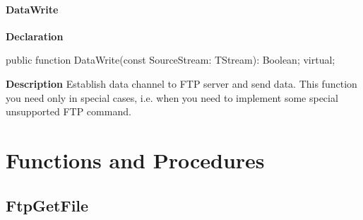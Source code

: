 \documentclass{report}
\newif\ifpdf
\begin{document}
\paragraph*{DataWrite}\hspace*{\fill}

\label{ftpsend.TFTPSend-DataWrite}
\begin{list}{}{
\setlength{\itemindent}{0cm}
\setlength{\listparindent}{0cm}
\setlength{\leftmargin}{\evensidemargin}
\addtolength{\leftmargin}{\tmplength}
\settowidth{\labelsep}{X}
\addtolength{\leftmargin}{\labelsep}
\setlength{\labelwidth}{\tmplength}
}
\item[\textbf{Declaration}\hfill]
\ifpdf
\begin{flushleft}
\fi
\begin{ttfamily}
public function DataWrite(const SourceStream: TStream): Boolean; virtual;\end{ttfamily}

\ifpdf
\end{flushleft}
\fi

\par
\item[\textbf{Description}]
Establish data channel to FTP server and send data. This function you need only in special cases, i.e. when you need to implement some special unsupported FTP command.

\end{list}
\section{Functions and Procedures}
\ifpdf
\subsection*{\large{\textbf{FtpGetFile}}\normalsize\hspace{1ex}\hrulefill}
\else
\end{document}
